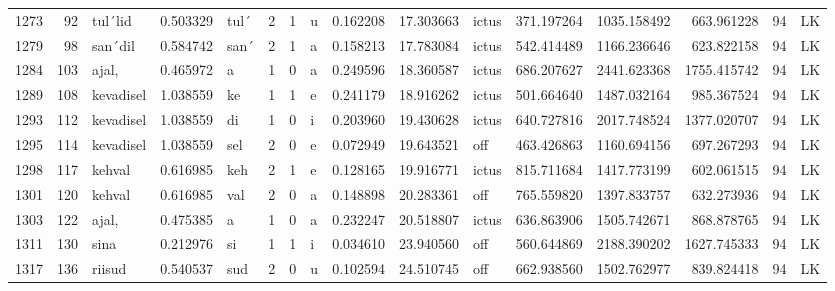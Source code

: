 \begin{tabular}{lrlrllllrrlrrrll}
1273 &          92 &          tul´lid &  0.503329 &    tul´ &        2 &      1 &       u &      0.162208 &     17.303663 &  ictus &   371.197264 &  1035.158492 &   663.961228 &     94 &        LK \\
1279 &          98 &          san´dil &  0.584742 &    san´ &        2 &      1 &       a &      0.158213 &     17.783084 &  ictus &   542.414489 &  1166.236646 &   623.822158 &     94 &        LK \\
1284 &         103 &            ajal, &  0.465972 &       a &        1 &      0 &       a &      0.249596 &     18.360587 &  ictus &   686.207627 &  2441.623368 &  1755.415742 &     94 &        LK \\
1289 &         108 &        kevadisel &  1.038559 &      ke &        1 &      1 &       e &      0.241179 &     18.916262 &  ictus &   501.664640 &  1487.032164 &   985.367524 &     94 &        LK \\
1293 &         112 &        kevadisel &  1.038559 &      di &        1 &      0 &       i &      0.203960 &     19.430628 &  ictus &   640.727816 &  2017.748524 &  1377.020707 &     94 &        LK \\
1295 &         114 &        kevadisel &  1.038559 &     sel &        2 &      0 &       e &      0.072949 &     19.643521 &    off &   463.426863 &  1160.694156 &   697.267293 &     94 &        LK \\
1298 &         117 &           kehval &  0.616985 &     keh &        2 &      1 &       e &      0.128165 &     19.916771 &  ictus &   815.711684 &  1417.773199 &   602.061515 &     94 &        LK \\
1301 &         120 &           kehval &  0.616985 &     val &        2 &      0 &       a &      0.148898 &     20.283361 &    off &   765.559820 &  1397.833757 &   632.273936 &     94 &        LK \\
1303 &         122 &            ajal, &  0.475385 &       a &        1 &      0 &       a &      0.232247 &     20.518807 &  ictus &   636.863906 &  1505.742671 &   868.878765 &     94 &        LK \\
1311 &         130 &             sina &  0.212976 &      si &        1 &      1 &       i &      0.034610 &     23.940560 &    off &   560.644869 &  2188.390202 &  1627.745333 &     94 &        LK \\
1317 &         136 &           riisud &  0.540537 &     sud &        2 &      0 &       u &      0.102594 &     24.510745 &    off &   662.938560 &  1502.762977 &   839.824418 &     94 &        LK \\

\end{tabular}
